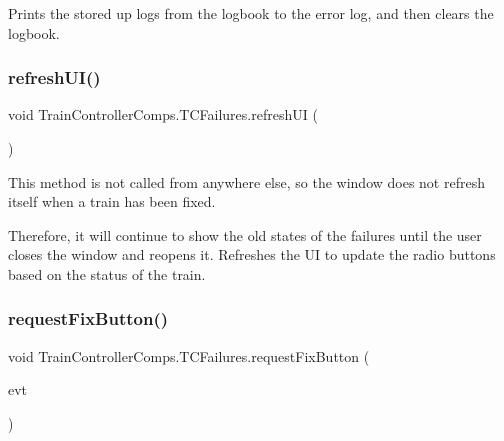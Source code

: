 Prints the stored up logs from the logbook to the error log, and then clears the logbook. 

\mbox{\label{classTrainControllerComps_1_1TCFailures_ac2b39b97af1de62e3c73a74d2b7a20e1}} 
\subsubsection{\texorpdfstring{refresh\+U\+I()}{refreshUI()}}
{\footnotesize\ttfamily void Train\+Controller\+Comps.\+T\+C\+Failures.\+refresh\+UI (\begin{DoxyParamCaption}{ }\end{DoxyParamCaption})\hspace{0.3cm}{\ttfamily [private]}}



This method is not called from anywhere else, so the window does not refresh itself when a train has been fixed. 

Therefore, it will continue to show the old states of the failures until the user closes the window and reopens it. Refreshes the UI to update the radio buttons based on the status of the train. \mbox{\label{classTrainControllerComps_1_1TCFailures_a16da0e026327d523cdcb1f4b9286e30a}} 
\subsubsection{\texorpdfstring{request\+Fix\+Button()}{requestFixButton()}}
{\footnotesize\ttfamily void Train\+Controller\+Comps.\+T\+C\+Failures.\+request\+Fix\+Button (\begin{DoxyParamCaption}\item[{java.\+awt.\+event.\+Action\+Event}]{evt }\end{DoxyParamCaption})\hspace{0.3cm}{\ttfamily [private]}}



